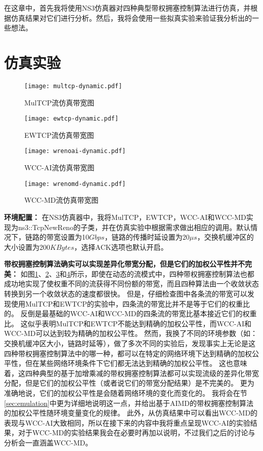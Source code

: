 \documentclass[winfonts]{njuthesis}
\begin{document}
在这章中，首先我将使用NS3仿真器\cite{NS3}对四种典型带权拥塞控制算法进行仿真，并根据仿真结果对它们进行分析。然后，我将会使用一些拟真实验来验证我分析出的一些想法。

\section{仿真实验}
\label{sec:simulation}

\begin{figure}[h]
  \centering
  \texttt{[image: multcp-dynamic.pdf]}
  \caption{MulTCP流仿真带宽图}
  \label{fig:MulTCPPerformance}
\end{figure}
\begin{figure}[h]
  \centering
  \texttt{[image: ewtcp-dynamic.pdf]}
  \caption{EWTCP流仿真带宽图}
  \label{fig:EWTCPPerformance}
\end{figure}
\begin{figure}[h]
  \centering
  \texttt{[image: wrenoai-dynamic.pdf]}
  \caption{WCC-AI流仿真带宽图}
  \label{fig:WReno-AIPerformance}
\end{figure}
\begin{figure}[h]
  \centering
  \texttt{[image: wrenomd-dynamic.pdf]}
  \caption{WCC-MD流仿真带宽图}
  \label{fig:WReno-MDPerformance}
\end{figure}

\textbf{环境配置：}
在NS3仿真器中，我将MulTCP，EWTCP，WCC-AI和WCC-MD实现为ns3::TcpNewReno的子类，并在仿真实验中根据需求做出相应的调用。默认情况下，链路的带宽设置为10$Gbps$，链路的传播时延设置为20$\mu s$，交换机缓冲区的大小设置为200$KBytes$，选择ACK选项也默认开启。

\textbf{带权拥塞控制算法确实可以实现差异化带宽分配，但是它们的加权公平性并不完美：}
如图\ref{fig:MulTCPPerformance}、\ref{fig:EWTCPPerformance}、\ref{fig:WReno-AIPerformance}和\ref{fig:WReno-MDPerformance}所示，即使在动态的流模式中，四种带权拥塞控制算法也都成功地实现了使权重不同的流获得不同份额的带宽，而且四种算法由一个收敛状态转换到另一个收敛状态的速度都很快。
但是，仔细检查图中各条流的带宽可以发现使用MulTCP和EWTCP的实验中，四条流的带宽比并不是等于它们的权重比的。
反倒是最基础的WCC-AI和WCC-MD的四条流的带宽比基本接近它们的权重比。
这似乎表明MulTCP和EWTCP不能达到精确的加权公平性，而WCC-AI和WCC-MD可以达到较为精确的加权公平性。
然而，我换了不同的环境参数（如：交换机缓冲区大小，链路时延等），做了多次不同的实验后，发现事实上无论是这四种带权拥塞控制算法中的哪一种，都可以在特定的网络环境下达到精确的加权公平性，但在某些网络环境条件下它们都无法达到精确的加权公平性。
这也意味着，这四种典型的基于加增乘减的带权拥塞控制算法都可以实现流级的差异化带宽分配，但是它们的加权公平性（或者说它们的带宽分配结果）是不完美的。
更为准确地说，它们的加权公平性是会随着网络环境的变化而变化的。
我将会在节\ref{sec:emulation}中更为详细地说明这一点，并给出基于AIMD的带权拥塞控制算法的加权公平性随环境变量变化的规律。
此外，从仿真结果中可以看出WCC-MD的表现与WCC-AI大致相同，所以在接下来的内容中我将重点呈现WCC-AI的实验结果，对于WCC-MD的实验结果我会在必要时再加以说明，不过我们之后的讨论与分析会一直涵盖WCC-MD。
\end{document}
